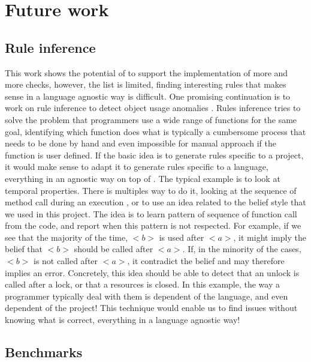 \section{Future work}
\label{sec:future_work}

\subsection{Rule inference}
\label{subsec:rule_inference}

This work shows the potential of \slang{} to support the implementation of more and more checks, however, the list is limited, finding interesting rules that makes sense in a language agnostic way is difficult. 
One promising continuation is to work on rule inference to detect object usage anomalies \cite{Wasylkowski:2007:DOU:1287624.1287632}. \newline
Rules inference tries to solve the problem that programmers use a wide range of functions for the same goal, identifying which function does what is typically a cumbersome process that needs to be done by hand and even impossible for manual approach if the function is user defined. 
If the basic idea is to generate rules specific to a project, it would make sense to adapt it to generate rules specific to a language, everything in an agnostic way on top of \slang{}. 
The typical example is to look at temporal properties. 
There is multiples way to do it, looking at the sequence of method call during an execution \cite{Gabel:2010:OIE:1806799.1806806}, or to use an idea related to the belief style \cite{Engler:2001:BDB:502059.502041} that we used in this project. 
The idea is to learn pattern of sequence of function call from the code, and report when this pattern is not respected.
For example, if we see that the majority of the time, \emph{$<b>$} is used after \emph{$<a>$}, it might imply the belief that \emph{$<b>$} should be called after \emph{$<a>$}. If, in the minority of the cases, \emph{$<b>$} is not called after \emph{$<a>$}, it contradict the belief and may therefore implies an error. 
Concretely, this idea should be able to detect that an unlock is called after a lock, or that a resources is closed. 
In this example, the way a programmer typically deal with them is dependent of the language, and even dependent of the project! \newline
This technique would enable us to find issues without knowing what is correct, everything in a language agnostic way!

\subsection{Benchmarks}
\label{subsec:benchmarks}

